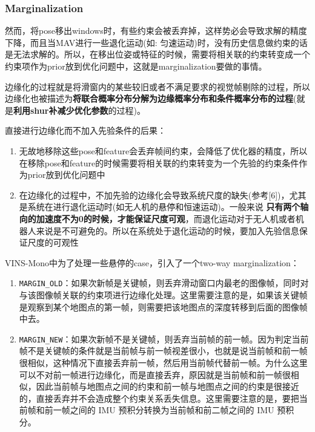\documentclass[12pt,a4paper]{article}
\begin{document}
\subsubsection{Marginalization}

然而，将pose移出windows时，有些约束会被丢弃掉，这样势必会导致求解的精度下降，而且当MAV进行一些退化运动(如: 匀速运动)时，没有历史信息做约束的话是无法求解的。所以，在移出位姿或特征的时候，需要将相关联的约束转变成一个约束项作为prior放到优化问题中，这就是marginalization要做的事情。

边缘化的过程就是将滑窗内的某些较旧或者不满足要求的视觉帧剔除的过程，所以边缘化也被描述为\textbf{将联合概率分布分解为边缘概率分布和条件概率分布的过程}(就是\textbf{利用shur补减少优化参数}的过程)。

直接进行边缘化而不加入先验条件的后果：

\begin{enumerate}
\item 无故地移除这些pose和feature会丢弃帧间约束，会降低了优化器的精度，所以在移除pose和feature的时候需要将相关联的约束转变为一个先验的约束条件作为prior放到优化问题中

\item 在边缘化的过程中，不加先验的边缘化会导致系统尺度的缺失(参考[6])，尤其是系统在进行退化运动时(如无人机的悬停和恒速运动)。一般来说 \textbf{只有两个轴向的加速度不为0的时候，才能保证尺度可观}，而退化运动对于无人机或者机器人来说是不可避免的。所以在系统处于退化运动的时候，要加入先验信息保证尺度的可观性
\end{enumerate}

VINS-Mono中为了处理一些悬停的case，引入了一个two-way marginalization：

\begin{enumerate}
\item \verb|MARGIN_OLD|：如果次新帧是关键帧，则丢弃滑动窗口内最老的图像帧，同时对与该图像帧关联的约束项进行边缘化处理。这里需要注意的是，如果该关键帧是观察到某个地图点的第一帧，则需要把该地图点的深度转移到后面的图像帧中去。

\item \verb|MARGIN_NEW|：如果次新帧不是关键帧，则丢弃当前帧的前一帧。因为判定当前帧不是关键帧的条件就是当前帧与前一帧视差很小，也就是说当前帧和前一帧很相似，这种情况下直接丢弃前一帧，然后用当前帧代替前一帧。为什么这里可以不对前一帧进行边缘化，而是直接丢弃，原因就是当前帧和前一帧很相似，因此当前帧与地图点之间的约束和前一帧与地图点之间的约束是很接近的，直接丢弃并不会造成整个约束关系丢失信息。这里需要注意的是，要把当前帧和前一帧之间的 IMU 预积分转换为当前帧和前二帧之间的 IMU 预积分。

\end{enumerate}
\end{document}
